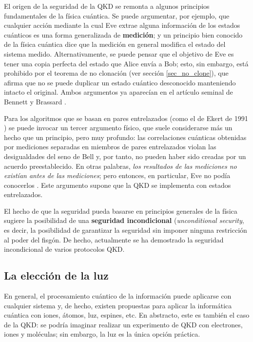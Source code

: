 \documentclass[a4paper,11pt]{book} %
\numberwithin{equation}{chapter}
\begin{document}
El origen de la seguridad de la QKD se remonta a algunos principios fundamentales de la física cuántica. Se puede argumentar, por ejemplo, que cualquier acción mediante la cual Eve extrae alguna información de los estados cuánticos es una forma generalizada de \textbf{medición}; y un principio bien conocido de la física cuántica dice que la medición en general modifica el estado del sistema medido. Alternativamente, se puede pensar que el objetivo de Eve es tener una copia perfecta del estado que Alice envía a Bob; esto, sin embargo, está prohibido por el teorema de no clonación (ver sección \ref{sec_no_clone}), que afirma que no se puede duplicar un estado cuántico desconocido manteniendo intacto el original. Ambos argumentos ya aparecían en el artículo seminal de Bennett y Brassard \cite{bib_BB84}. 

Para los algoritmos que se basan en pares entrelazados (como el de Ekert de 1991 \cite{bib_Ekert-1991})  se puede invocar un tercer argumento físico, que suele considerarse más un hecho que un principio, pero muy profundo: las correlaciones cuánticas obtenidas por mediciones separadas en miembros de pares entrelazados violan las desigualdades del seno de Bell y, por tanto, no pueden haber sido creadas por un acuerdo preestablecido. En otras palabras, \textit{los resultados de las mediciones no existían antes de las mediciones}; pero entonces, en particular, Eve no podía conocerlos \cite{bib_Ekert-1991}. Este argumento supone que la QKD se implementa con estados entrelazados.		

El hecho de que la seguridad pueda basarse en principios generales de la física sugiere la posibilidad de una \textbf{seguridad incondicional} (\textit{unconditional security}, es decir, la posibilidad de garantizar la seguridad sin imponer ninguna restricción al poder del fisgón. De hecho, actualmente se ha demostrado la seguridad incondicional de varios protocolos QKD.
		
		\subsection{La elección de la luz}

En general, el procesamiento cuántico de la información puede aplicarse con cualquier sistema y, de hecho, existen propuestas para aplicar la informática cuántica con iones, átomos, luz, espines, etc. En abstracto, este es también el caso de la QKD: se podría imaginar realizar un experimento de QKD con electrones, iones y moléculas; sin embargo, la luz es la única opción práctica.
\end{document}
